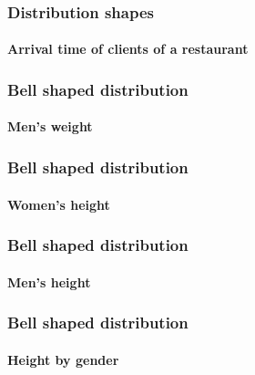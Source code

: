 \begin{frame}
\frametitle{Distribution shapes}
\framesubtitle{Arrival time of clients of a restaurant}
\begin{center}
\scalebox{0.6}{}
\end{center} 
\end{frame}


\begin{frame}
\frametitle{Bell shaped distribution}
\framesubtitle{Men's weight}
\begin{center}
\scalebox{0.6}{}
\end{center} 
\end{frame}


\begin{frame}
\frametitle{Bell shaped distribution}
\framesubtitle{Women's height}
\begin{center}
\scalebox{0.6}{}
\end{center} 
\end{frame}


\begin{frame}
\frametitle{Bell shaped distribution}
\framesubtitle{Men's height}
\begin{center}
\scalebox{0.6}{}
\end{center} 
\end{frame}


\begin{frame}
\frametitle{Bell shaped distribution}
\framesubtitle{Height by gender}
\begin{center}
\scalebox{0.6}{}
\end{center} 
\end{frame}


